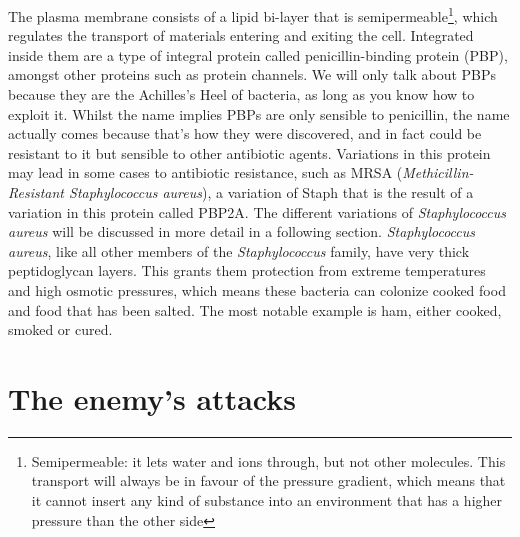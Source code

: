 The plasma membrane consists of a lipid bi-layer that is semipermeable\footnote{Semipermeable: it lets water and ions through, but not other molecules. This transport will always be in favour of the pressure gradient, which means that it cannot insert any kind of substance into an environment that has a higher pressure than the other side}, which regulates the transport of materials entering and exiting the cell. Integrated inside them are a type of integral protein called penicillin-binding protein (PBP), amongst other  proteins such as protein channels. We will only talk about PBPs because they are the Achilles's Heel of bacteria, as long as you know how to exploit it. Whilst the name implies PBPs are only sensible to penicillin, the name actually comes because that's how they were discovered, and in fact could be resistant to it but sensible to other antibiotic agents. Variations in this protein may lead in some cases to antibiotic resistance, such as MRSA (\emph{Methicillin-Resistant \emph{Staphylococcus aureus}}), a variation of Staph that is the result of a variation in this protein called PBP2A. The different variations of \emph{Staphylococcus aureus} will be discussed in more detail in a following section. \newline
\emph{Staphylococcus aureus}, like all other members of the \emph{Staphylococcus} family, have very thick peptidoglycan layers. This grants them protection from extreme temperatures and high osmotic pressures, which means these bacteria can colonize cooked food and food that has been salted. The most notable example is ham, either cooked, smoked or cured.
\section{The enemy's attacks}
